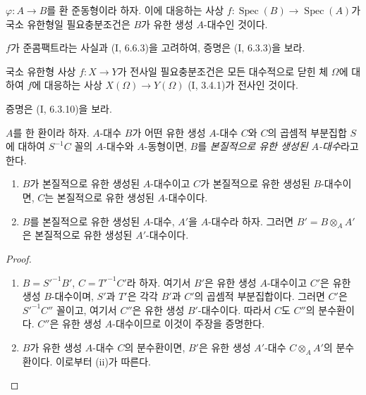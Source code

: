 \begin{proposition}[1.3.6]
\label{IV.1.3.6-fr}
$\varphi:A\to B$를 환 준동형이라 하자. 이에 대응하는 사상
$f:\operatorname{Spec}(B)\to\operatorname{Spec}(A)$가 국소
유한형일 필요충분조건은 $B$가 유한 생성 $A$-대수인 것이다.
\end{proposition}

$f$가 준콤팩트라는 사실과 (I, 6.6.3)을 고려하여, 증명은
(I, 6.3.3)을 보라.

\begin{proposition}[1.3.7]
\label{IV.1.3.7-fr}
국소 유한형 사상 $f:X\to Y$가 전사일 필요충분조건은 모든 대수적으로
닫힌 체 $\Omega$에 대하여 $f$에 대응하는 사상
$X(\Omega)\to Y(\Omega)$ (I, 3.4.1)가 전사인 것이다.
\end{proposition}

증명은 (I, 6.3.10)을 보라.

\begin{env}[1.3.8]
\label{IV.1.3.8-fr}
$A$를 한 환이라 하자. $A$-대수 $B$가 어떤 유한 생성 $A$-대수 $C$와
$C$의 곱셈적 부분집합 $S$에 대하여 $S^{-1}C$ 꼴의 $A$-대수와
$A$-동형이면, $B$를 \emph{본질적으로 유한 생성된 $A$-대수}라고 한다.
\end{env}

\par\medskip\noindent
\begin{proposition}[1.3.9]
\label{IV.1.3.9-fr}
\begin{enumerate}
  \item[(i)] $B$가 본질적으로 유한 생성된 $A$-대수이고 $C$가
  본질적으로 유한 생성된 $B$-대수이면, $C$는 본질적으로 유한
  생성된 $A$-대수이다.
  \item[(ii)] $B$를 본질적으로 유한 생성된 $A$-대수, $A'$을
  $A$-대수라 하자. 그러면 $B'=B\otimes_AA'$은 본질적으로 유한
  생성된 $A'$-대수이다.
\end{enumerate}
\end{proposition}

\begin{proof}
\begin{enumerate}
  \item[(i)] $B=S'^{-1}B'$, $C=T'^{-1}C'$라 하자. 여기서 $B'$은
  유한 생성 $A$-대수이고 $C'$은 유한 생성 $B$-대수이며, $S'$과
  $T'$은 각각 $B'$과 $C'$의 곱셈적 부분집합이다. 그러면 $C'$은
  $S'^{-1}C''$ 꼴이고, 여기서 $C''$은 유한 생성 $B'$-대수이다.
  따라서 $C$도 $C''$의 분수환이다. $C''$은 유한 생성 $A$-대수이므로
  이것이 주장을 증명한다.
  \item[(ii)] $B$가 유한 생성 $A$-대수 $C$의 분수환이면, $B'$은
  유한 생성 $A'$-대수 $C\otimes_AA'$의 분수환이다. 이로부터
  (ii)가 따른다.
\end{enumerate}
\end{proof}


